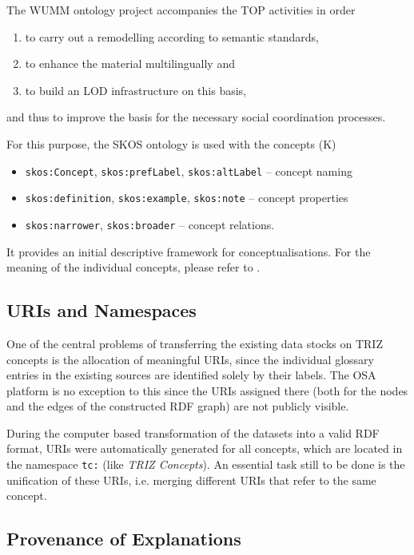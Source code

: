 \documentclass[11pt,a4paper]{article}
\begin{document}
The WUMM ontology project accompanies the TOP activities in order 
\begin{enumerate}[noitemsep]
\item to carry out a remodelling according to semantic standards,
\item to enhance the material multilingually and
\item to build an LOD infrastructure on this basis,
\end{enumerate}
and thus to improve the basis for the necessary social coordination processes.

For this purpose, the SKOS ontology \cite{SKOS} is used with the concepts (K)
\begin{itemize}[noitemsep]
\item \texttt{skos:Concept}, \texttt{skos:prefLabel}, \texttt{skos:altLabel}
  -- concept naming
\item \texttt{skos:definition}, \texttt{skos:example}, \texttt{skos:note} --
  concept properties
\item \texttt{skos:narrower}, \texttt{skos:broader} -- concept relations.
\end{itemize}
It provides an initial descriptive framework for conceptualisations.  For the
meaning of the individual concepts, please refer to \cite{SKOS}.

\subsection{URIs and Namespaces}

One of the central problems of transferring the existing data stocks on TRIZ
concepts is the allocation of meaningful URIs, since the individual glossary
entries in the existing sources are identified solely by their labels.  The
OSA platform is no exception to this since the URIs assigned there (both for
the nodes and the edges of the constructed RDF graph) are not publicly
visible.

During the computer based transformation of the datasets into a valid RDF
format, URIs were automatically generated for all concepts, which are located
in the namespace \texttt{tc:} (like \emph{TRIZ Concepts}). An essential task
still to be done is the unification of these URIs, i.e. merging different URIs
that refer to the same concept. 

\subsection{Provenance of Explanations}
\end{document}
